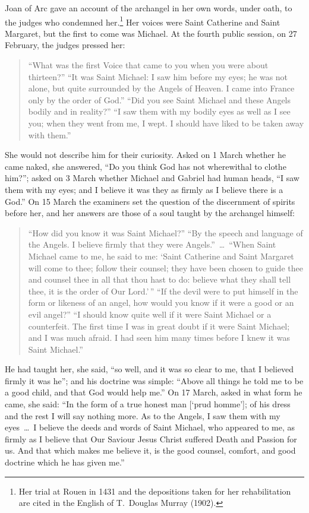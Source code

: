 Joan of Arc gave an account of the archangel in her own words, under oath,
to the judges who condemned her.\footnote{Her trial at Rouen in 1431 and
the depositions taken for her rehabilitation are cited in the English of
T.\ Douglas Murray (1902).} Her voices were Saint Catherine and Saint Margaret, but the first to come
was Michael. At the fourth public session, on 27 February, the judges pressed
her:
\begin{quote}
``What was the first Voice that came to you when you were about thirteen?''
``It was Saint Michael: I saw him before my eyes; he was not alone, but
quite surrounded by the Angels of Heaven. I came into France only by the
order of God.'' ``Did you see Saint Michael and these Angels bodily and in
reality?'' ``I saw them with my bodily eyes as well as I see you; when they
went from me, I wept. I should have liked to be taken away with them.''
\end{quote}
She would not describe him for their curiosity. Asked on 1 March whether he
came naked, she answered, ``Do you think God has not wherewithal to clothe
him?''; asked on 3 March whether Michael and Gabriel had human heads, ``I saw
them with my eyes; and I believe it was they as firmly as I believe there is
a God.'' On 15 March the examiners set the question of the discernment of
spirits before her, and her answers are those of a soul taught by the
archangel himself:
\begin{quote}
``How did you know it was Saint Michael?'' ``By the speech and language of
the Angels. I believe firmly that they were Angels.''~\dots\ ``When Saint
Michael came to me, he said to me: `Saint Catherine and Saint Margaret will
come to thee; follow their counsel; they have been chosen to guide thee and
counsel thee in all that thou hast to do: believe what they shall tell thee,
it is the order of Our Lord.'\,'' ``If the devil were to put himself in the
form or likeness of an angel, how would you know if it were a good or an
evil angel?'' ``I should know quite well if it were Saint Michael or a
counterfeit. The first time I was in great doubt if it were Saint Michael;
and I was much afraid. I had seen him many times before I knew it was Saint
Michael.''
\end{quote}
He had taught her, she said, ``so well, and it was so clear to me, that I
believed firmly it was he''; and his doctrine was simple: ``Above all things
he told me to be a good child, and that God would help me.'' On 17 March,
asked in what form he came, she said: ``In the form of a true honest man
[`prud homme']; of his dress and the rest I will say nothing more. As to the
Angels, I saw them with my eyes~\dots\ I believe the deeds and words of Saint
Michael, who appeared to me, as firmly as I believe that Our Saviour Jesus
Christ suffered Death and Passion for us. And that which makes me believe
it, is the good counsel, comfort, and good doctrine which he has given me.''

